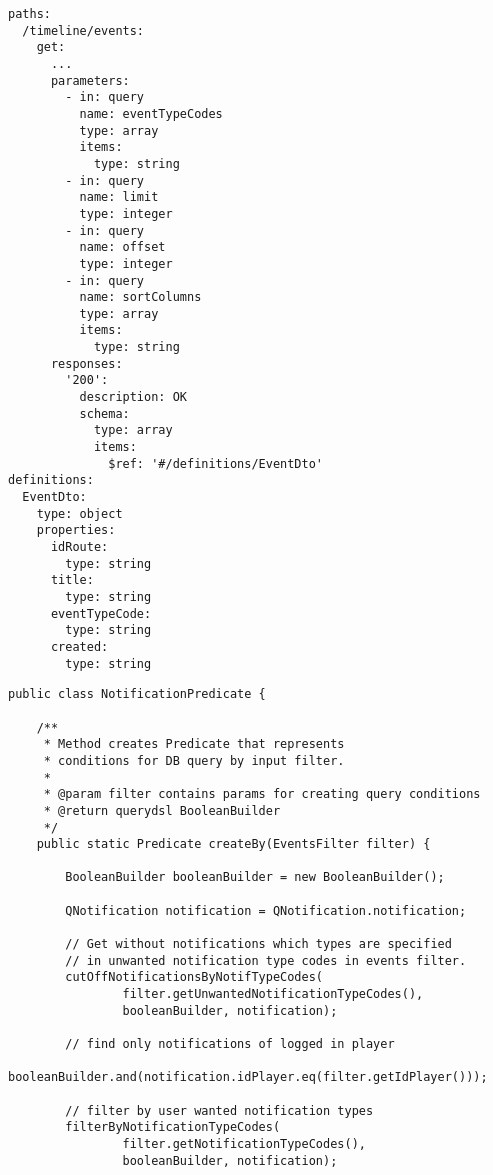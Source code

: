 \documentclass[twoside, 12pt]{article}
\begin{document}
{{

\begin{lstlisting}
paths:
  /timeline/events:
    get:
      ...
      parameters:
        - in: query
          name: eventTypeCodes
          type: array
          items:
            type: string
        - in: query
          name: limit
          type: integer
        - in: query
          name: offset
          type: integer
        - in: query
          name: sortColumns
          type: array
          items:
            type: string
      responses:
        '200':
          description: OK
          schema:
            type: array
            items:
              $ref: '#/definitions/EventDto'
definitions:
  EventDto:
    type: object
    properties:
      idRoute:
        type: string
      title:
        type: string
      eventTypeCode:
        type: string
      created:
        type: string
\end{lstlisting}

\clearpage


\begin{lstlisting}
public class NotificationPredicate {

    /**
     * Method creates Predicate that represents
     * conditions for DB query by input filter.
     *
     * @param filter contains params for creating query conditions
     * @return querydsl BooleanBuilder
     */
    public static Predicate createBy(EventsFilter filter) {

        BooleanBuilder booleanBuilder = new BooleanBuilder();

        QNotification notification = QNotification.notification;

        // Get without notifications which types are specified
        // in unwanted notification type codes in events filter.
        cutOffNotificationsByNotifTypeCodes(
                filter.getUnwantedNotificationTypeCodes(),
                booleanBuilder, notification);

        // find only notifications of logged in player
        booleanBuilder.and(notification.idPlayer.eq(filter.getIdPlayer()));

        // filter by user wanted notification types
        filterByNotificationTypeCodes(
                filter.getNotificationTypeCodes(),
                booleanBuilder, notification);



\end{lstlisting}}}
\end{document}
